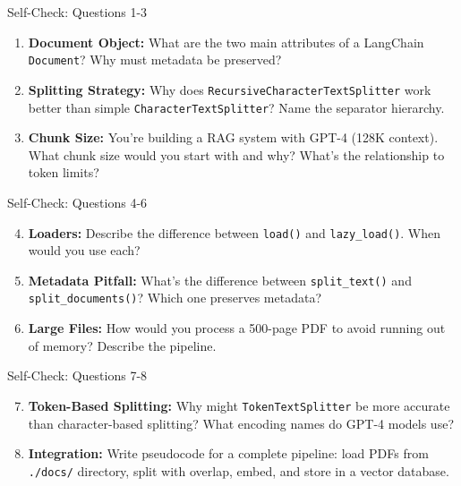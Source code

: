 \documentclass[aspectratio=169,11pt]{beamer}
\begin{document}
\begin{frame}{Self-Check: Questions 1-3}
  \begin{enumerate}
    \setlength{\itemsep}{0pt}
    \item \textbf{Document Object:} What are the two main attributes of a LangChain \texttt{Document}? Why must metadata be preserved?

    \vspace{0.4cm}
    \item \textbf{Splitting Strategy:} Why does \texttt{RecursiveCharacterTextSplitter} work better than simple \texttt{CharacterTextSplitter}? Name the separator hierarchy.

    \vspace{0.4cm}
    \item \textbf{Chunk Size:} You're building a RAG system with GPT-4 (128K context). What chunk size would you start with and why? What's the relationship to token limits?
  \end{enumerate}
\end{frame}

\begin{frame}{Self-Check: Questions 4-6}
  \begin{enumerate}
    \setcounter{enumi}{3}
    \setlength{\itemsep}{0pt}
    \item \textbf{Loaders:} Describe the difference between \texttt{load()} and \texttt{lazy\_load()}. When would you use each?

    \vspace{0.4cm}
    \item \textbf{Metadata Pitfall:} What's the difference between \texttt{split\_text()} and \texttt{split\_documents()}? Which one preserves metadata?

    \vspace{0.4cm}
    \item \textbf{Large Files:} How would you process a 500-page PDF to avoid running out of memory? Describe the pipeline.
  \end{enumerate}
\end{frame}

\begin{frame}{Self-Check: Questions 7-8}
  \begin{enumerate}
    \setcounter{enumi}{6}
    \setlength{\itemsep}{0pt}
    \item \textbf{Token-Based Splitting:} Why might \texttt{TokenTextSplitter} be more accurate than character-based splitting? What encoding names do GPT-4 models use?

    \vspace{0.6cm}
    \item \textbf{Integration:} Write pseudocode for a complete pipeline: load PDFs from \texttt{./docs/} directory, split with overlap, embed, and store in a vector database.
  \end{enumerate}
\end{frame}
\end{document}
